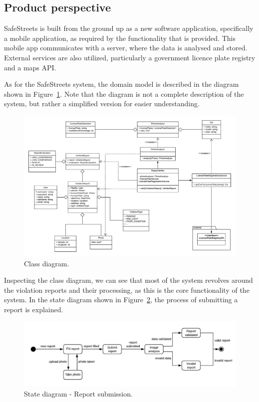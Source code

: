 \subsection{Product perspective}

SafeStreets is built from the ground up as a new software application, specifically a mobile application, as required by the functionality that is provided. This mobile app communicates with a server, where the data is analysed and stored. External services are also utilized, particularly a government licence plate registry and a maps API.

As for the SafeStreets system, the domain model is described in the diagram shown in Figure~\ref{fig:class-general}. Note that the diagram is not a complete description of the system, but rather a simplified version for easier understanding.

\begin{figure}[!h]
\centering
\includegraphics[width=\textwidth]{Images/class-general.png}
\caption{\label{fig:class-general}Class diagram.}
\end{figure}

Inspecting the class diagram, we can see that most of the system revolves around the violation reports and their processing, as this is the core functionality of the system.
In the state diagram shown in Figure~\ref{fig:state-report-submission}, the process of submitting a report is explained.

\begin{figure}[!h]
\centering
\includegraphics[width=\textwidth]{Images/state-report-submission.png}
\caption{\label{fig:state-report-submission}State diagram - Report submission.}
\end{figure}

